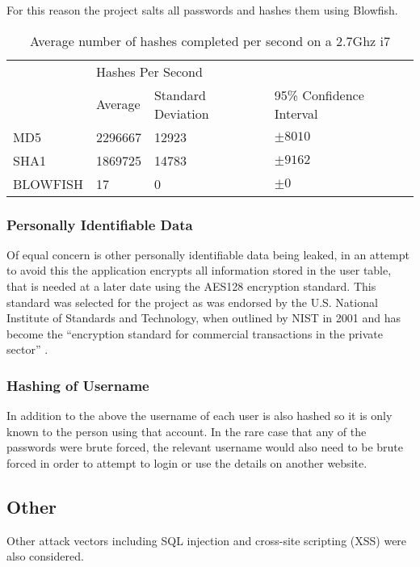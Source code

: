 For this reason the project salts all passwords and hashes them using Blowfish.

\begin{table}[h]
\begin{tabular}{llll}
         & \multicolumn{3}{l}{Hashes Per Second}                   \\
         & Average & Standard Deviation & 95\% Confidence Interval \\
MD5      & \num{2296667} & \num{12923}              & $\pm 8010$                 \\
SHA1     & \num{1869725} & \num{14783}             & $\pm 9162$                 \\
BLOWFISH & 17      & 0                   & $\pm 0$                    \\
\end{tabular}
\label{tab:hashspeed}
\caption{Average number of hashes completed per second on a 2.7Ghz i7 }
\end{table}

\subsubsection{Personally Identifiable Data}
Of equal concern is other personally identifiable data being leaked, in an attempt to avoid this the application encrypts all information stored in the user table, that is needed at a later date using the AES128 encryption standard. This standard was selected for the project as was endorsed by the U.S. National Institute of Standards and Technology, when outlined by NIST in 2001 and has become the ``encryption standard for commercial transactions in the private sector'' \cite{nist2010aes, stair2009informationsystems}.

\subsubsection{Hashing of Username}
In addition to the above the username of each user is also hashed so it is only known to the person using that account. In the rare case that any of the passwords were brute forced, the relevant username would also need to be brute forced in order to attempt to login or use the details on another website.

\subsection{Other}
Other attack vectors including SQL injection and cross-site scripting (XSS) were also considered.

